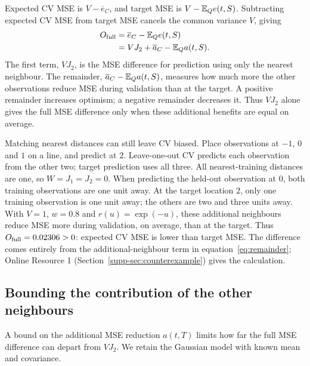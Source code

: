 Expected CV MSE is $V-\overline{e}_C$, and target MSE is $V-\mathbb{E}_Q e(t,S)$. Subtracting expected CV MSE from target MSE cancels the common variance $V$, giving
\begin{equation}
\begin{aligned}
 O_{\mathrm{full}}&=\overline e_C-\mathbb{E}_Q e(t,S)\\
 &=VJ_2+\overline a_C-\mathbb{E}_Q a(t,S).
\end{aligned}
\label{eq:remainder}
\end{equation}
The first term, $VJ_2$, is the MSE difference for prediction using only the nearest neighbour. The remainder, $\overline{a}_C-\mathbb{E}_Q a(t,S)$, measures how much more the other observations reduce MSE during validation than at the target. A positive remainder increases optimism; a negative remainder decreases it. Thus $VJ_2$ alone gives the full MSE difference only when these additional benefits are equal on average.

Matching nearest distances can still leave CV biased. Place observations at $-1$, $0$ and $1$ on a line, and predict at $2$. Leave-one-out CV predicts each observation from the other two; target prediction uses all three. All nearest-training distances are one, so $W=J_1=J_2=0$. When predicting the held-out observation at $0$, both training observations are one unit away. At the target location $2$, only one training observation is one unit away; the others are two and three units away. With $V=1$, $w=0.8$ and $r(u)=\exp(-u)$, these additional neighbours reduce MSE more during validation, on average, than at the target. Thus $O_{\mathrm{full}}=0.02306>0$: expected CV MSE is lower than target MSE. The difference comes entirely from the additional-neighbour term in equation~\eqref{eq:remainder}; Online Resource 1 (Section~\ref*{supp-sec:counterexample}) gives the calculation.

\subsection{Bounding the contribution of the other neighbours}
A bound on the additional MSE reduction $a(t,T)$ limits how far the full MSE difference can depart from $VJ_2$. We retain the Gaussian model with known mean and covariance.

